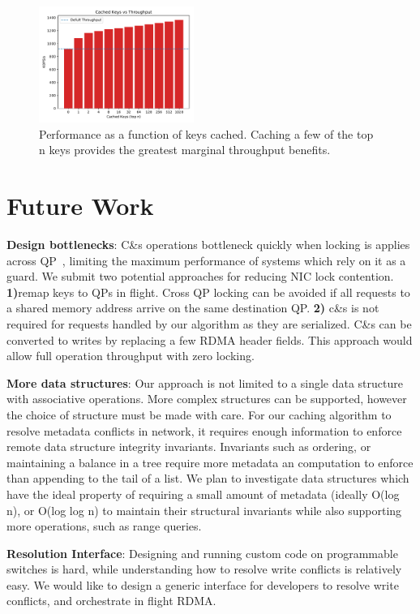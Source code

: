 \begin{figure}
    \includegraphics[width=0.45\textwidth]{fig/cache.pdf}
    \caption{Performance as a function of keys cached. Caching a few
    of the top n keys provides the greatest marginal throughput
    benefits.}
    \label{fig:cache}
\end{figure}

\section{Future Work}

\textbf{Design bottlenecks}: 
C\&s operations bottleneck quickly when locking is applies across
QP~\cite{design-guidelines}, limiting the maximum performance of
systems which rely on it as a guard.  We submit two potential
approaches for reducing NIC lock contention.  \textbf{1)}remap keys to
QPs in flight. Cross QP locking can be avoided if all requests to a
shared memory address arrive on the same destination QP. \textbf{2)}
c\&s is not required for requests handled by our algorithm as they are
serialized. C\&s can be converted to writes by replacing a few RDMA
header fields. This approach would allow full operation throughput with
zero locking.

\textbf{More data structures}:
Our approach is not limited to a single
data structure with associative operations. More complex structures
can be supported, however the choice of structure must be made with
care.  For our caching algorithm to resolve metadata conflicts in
network, it requires enough information to enforce remote data
structure integrity invariants. Invariants such as ordering, or
maintaining a balance in a tree require more metadata an computation to
enforce than appending to the tail of a list. We plan to investigate
data structures which have the ideal property of requiring a small
amount of metadata (ideally O(log n), or O(log log n) to maintain
their structural invariants while also supporting more operations, such
as range queries.

\textbf{Resolution Interface}:
Designing and running custom code on
programmable switches is hard, while understanding how to resolve
write conflicts is relatively easy. We would like to design a generic
interface for developers to resolve write conflicts, and orchestrate
in flight RDMA.
